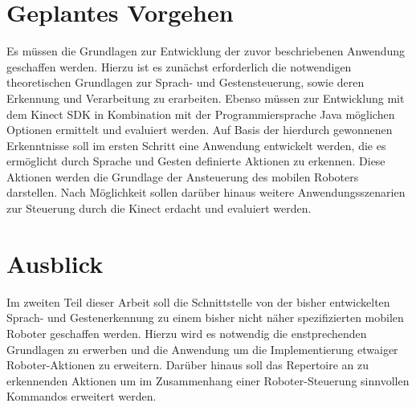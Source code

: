 \section{Geplantes Vorgehen}


%

Es müssen die Grundlagen zur Entwicklung der zuvor beschriebenen Anwendung geschaffen werden. 
Hierzu ist es zun\"achst erforderlich die notwendigen theoretischen Grundlagen zur Sprach- und Gestensteuerung, sowie deren Erkennung und Verarbeitung zu erarbeiten.
Ebenso müssen  zur Entwicklung mit dem Kinect SDK in Kombination mit der Programmiersprache Java m\"oglichen Optionen ermittelt und evaluiert werden.
Auf Basis der hierdurch gewonnenen Erkenntnisse soll im ersten Schritt eine Anwendung entwickelt werden, die es erm\"oglicht durch Sprache und Gesten definierte Aktionen zu erkennen. 
Diese Aktionen werden die Grundlage der Ansteuerung des mobilen Roboters darstellen.
\newline
Nach M\"oglichkeit sollen dar\"uber hinaus weitere Anwendungsszenarien zur Steuerung durch die Kinect erdacht und evaluiert werden.

\section{Ausblick}


Im zweiten Teil dieser Arbeit soll die Schnittstelle von der bisher entwickelten Sprach- und Gestenerkennung zu einem bisher nicht näher spezifizierten mobilen Roboter geschaffen werden.
Hierzu wird es notwendig die enstprechenden Grundlagen zu erwerben und die Anwendung um die Implementierung etwaiger Roboter-Aktionen zu erweitern.
Dar\"uber hinaus soll das Repertoire an zu erkennenden Aktionen um im Zusammenhang einer Roboter-Steuerung sinnvollen Kommandos erweitert werden.